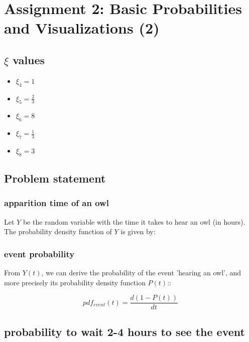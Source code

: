 \chapter{Assignment 2: Basic Probabilities and Visualizations (2)}

\section{$\xi$ values}

\begin{itemize}
    \item $\xi_4 = 1$
    \item $\xi_5 = \frac{2}{3}$
    \item $\xi_6 = 8$
    \item $\xi_7 = \frac{1}{3}$
    \item $\xi_8 = 3$
\end{itemize}

\section{Problem statement}
\subsection*{apparition time of an owl}
Let $Y$ be the random variable with the time it takes to hear an owl (in hours).
The probability density function of $Y$ is given by:


\subsection*{event probability}

From $Y(t)$, we can derive the probability of the event 'hearing an owl', and more precisely its probability density function $P(t)$::

\begin{equation}
    pdf_{event}(t) = \frac{d(1-P(t))}{dt}
\end{equation}

\section{probability to wait 2-4 hours to see the event}

